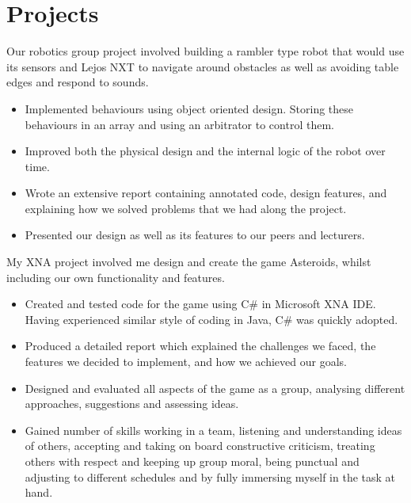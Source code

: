 \documentclass[10pt,a4paper]{moderncv}
\begin{document}
    \section{Projects}
    {
    Our robotics group project involved building a rambler type robot that would use its sensors and Lejos NXT to navigate around obstacles as well as avoiding table edges and respond to sounds.
    \begin{itemize}
        \item Implemented behaviours using object oriented design. Storing these behaviours in an array and using an arbitrator to control them.
        \item Improved both the physical design and the internal logic of the robot over time.
        \item Wrote an extensive report containing annotated code, design features, and explaining how we solved problems that we had along the project.
        \item Presented our design as well as its features to our peers and lecturers.
    \end{itemize}
    }
    {
    My XNA project involved me design and create the game Asteroids, whilst including our own functionality and features.
    \begin{itemize}
        \item Created and tested code for the game using C\# in Microsoft XNA IDE. Having experienced similar style of coding in Java, C\# was quickly adopted.
        \item Produced a detailed report which explained the challenges we faced, the features we decided to implement, and how we achieved our goals.
        \item Designed and evaluated all aspects of the game as a group, analysing different approaches, suggestions and assessing ideas.
        \item Gained number of skills working in a team, listening and understanding ideas of others, accepting and taking on board constructive criticism, treating others with respect and keeping up group moral, being punctual and adjusting to different schedules and by fully immersing myself in the task at hand.
    \end{itemize}
    }
\end{document}
